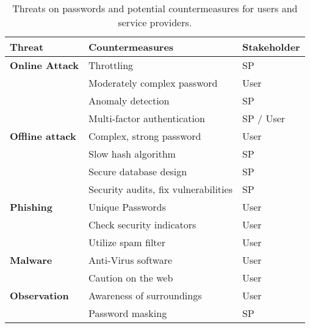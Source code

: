 \begin{table}[htbp]
  \centering
  \caption{\label{table:rw:attacks_countermeasures}Threats on passwords and potential countermeasures for users and service providers.}
    \begin{tabular}{rll}
    \multicolumn{1}{l}{\textbf{Threat}} & \textbf{Countermeasures} & \textbf{Stakeholder} \\
    \hline
    \multicolumn{1}{l}{\textbf{Online Attack}} & Throttling & SP \\
          & Moderately complex password & User \\
          & Anomaly detection & SP \\
          & Multi-factor authentication & SP / User \\
    \multicolumn{1}{l}{\textbf{Offline attack}} & Complex, strong password & User \\
          & Slow hash algorithm & SP \\
          & Secure database design & SP \\
          & Security audits, fix vulnerabilities & SP \\
    \multicolumn{1}{l}{\textbf{Phishing}} & Unique Passwords & User \\
          & Check security indicators & User \\
          & Utilize spam filter & User \\
    \multicolumn{1}{l}{\textbf{Malware}} & Anti-Virus software & User \\
          & Caution on the web & User \\
    \multicolumn{1}{l}{\textbf{Observation}} & Awareness of surroundings & User \\
          & Password masking & SP \\
    \end{tabular}%
\end{table}%